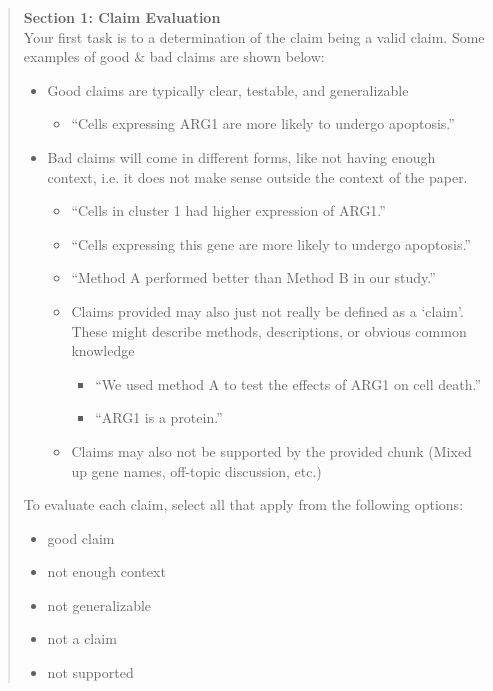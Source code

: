 \begin{quote}
\textbf{Section 1: Claim Evaluation}\\
Your first task is to a determination of the claim being a valid claim. Some examples of good \& bad claims are shown below:
\begin{itemize}
    \item Good claims are typically clear, testable, and generalizable
    \begin{itemize}
        \item ``Cells expressing ARG1 are more likely to undergo apoptosis.''
    \end{itemize}
    \item Bad claims will come in different forms, like not having enough context, i.e. it does not make sense outside the context of the paper.
    \begin{itemize}
        \item ``Cells in cluster 1 had higher expression of ARG1.''
        \item ``Cells expressing this gene are more likely to undergo apoptosis.''
        \item ``Method A performed better than Method B in our study.''
        \item Claims provided may also just not really be defined as a `claim'. These might describe methods, descriptions, or obvious common knowledge
            \begin{itemize}
                \item ``We used method A to test the effects of ARG1 on cell death.''
                \item ``ARG1 is a protein.''
            \end{itemize}
        \item Claims may also not be supported by the provided chunk (Mixed up gene names, off-topic discussion, etc.)
    \end{itemize}
\end{itemize}
To evaluate each claim, select all that apply from the following options:
\begin{itemize}
    \item good claim
    \item not enough context
    \item not generalizable
    \item not a claim
    \item not supported
\end{itemize}


\end{quote}
